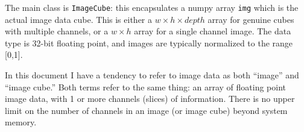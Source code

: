 The main class is \texttt{ImageCube}: this encapsulates a numpy array
\texttt{img}
which is the actual image data cube. This is either a 
$w \times h \times depth$ array for genuine cubes with multiple channels,
or a $w \times h$ array for a single channel image. The data type is 32-bit floating
point, and images are typically normalized to the range [0,1].

\begin{notebox}
In this document I have a tendency to refer to image data as both ``image'' and ``image cube.''
Both terms refer to the same thing: an array of floating point image data, with 1 or more channels (slices)
of information. There is no upper limit on the number of channels in an image (or image cube)
beyond system memory.
\end{notebox}

